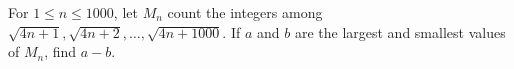 For $1\le n\le1000$, let $M_n$ count the integers among $\sqrt{4n+1},\sqrt{4n+2},\ldots,\sqrt{4n+1000}$. If $a$ and $b$ are the largest and smallest values of $M_n$, find $a-b$.
